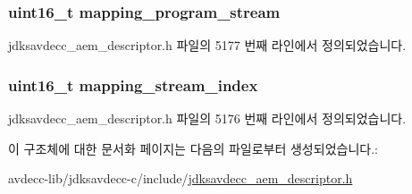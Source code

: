 \subsubsection[{\texorpdfstring{mapping\+\_\+program\+\_\+stream}{mapping_program_stream}}]{\setlength{\rightskip}{0pt plus 5cm}uint16\+\_\+t mapping\+\_\+program\+\_\+stream}\hypertarget{structjdksavdecc__video__mappings__format_a71a5421044e2dd9e8a1bc1667b0acf84}{}\label{structjdksavdecc__video__mappings__format_a71a5421044e2dd9e8a1bc1667b0acf84}


jdksavdecc\+\_\+aem\+\_\+descriptor.\+h 파일의 5177 번째 라인에서 정의되었습니다.

\subsubsection[{\texorpdfstring{mapping\+\_\+stream\+\_\+index}{mapping_stream_index}}]{\setlength{\rightskip}{0pt plus 5cm}uint16\+\_\+t mapping\+\_\+stream\+\_\+index}\hypertarget{structjdksavdecc__video__mappings__format_ae776f05f1f60f83a69c154844271ca4a}{}\label{structjdksavdecc__video__mappings__format_ae776f05f1f60f83a69c154844271ca4a}


jdksavdecc\+\_\+aem\+\_\+descriptor.\+h 파일의 5176 번째 라인에서 정의되었습니다.



이 구조체에 대한 문서화 페이지는 다음의 파일로부터 생성되었습니다.\+:\begin{DoxyCompactItemize}
\item 
avdecc-\/lib/jdksavdecc-\/c/include/\hyperlink{jdksavdecc__aem__descriptor_8h}{jdksavdecc\+\_\+aem\+\_\+descriptor.\+h}\end{DoxyCompactItemize}
